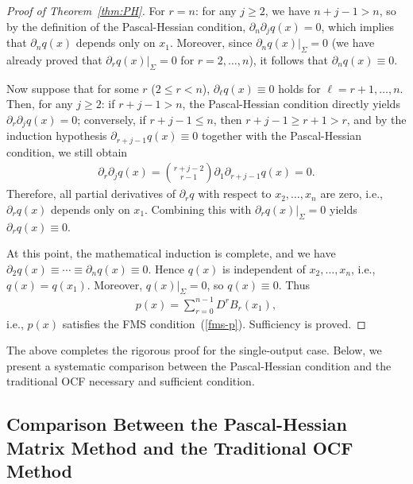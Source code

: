 \documentclass[11pt]{article}
\begin{document}
\begin{proof}[Proof of Theorem~\ref{thm:PH}]
	For $r=n$: for any $j\geq 2$, we have $n+j-1 > n$, so by the definition of the Pascal-Hessian condition, $\partial_n\partial_j q(x) = 0$, which implies that $\partial_n q(x)$ depends only on $x_1$. Moreover, since $\partial_n q(x)|_\Sigma = 0$ (we have already proved that $\partial_r q(x)|_\Sigma=0$ for $r=2,\ldots,n$), it follows that $\partial_n q(x) \equiv 0$.
	
	Now suppose that for some $r$ ($2 \leq r < n$), $\partial_\ell q(x) \equiv 0$ holds for $\ell = r+1,\ldots,n$. Then, for any $j\geq 2$: if $r+j-1 > n$, the Pascal-Hessian condition directly yields $\partial_r\partial_j q(x) = 0$; conversely, if $r+j-1 \leq n$, then $r+j-1 \geq r+1 > r$, and by the induction hypothesis $\partial_{r+j-1} q(x) \equiv 0$ together with the Pascal-Hessian condition, we still obtain
	\begin{align}
		\partial_r\partial_j q(x)=\binom{r+j-2}{r-1}\partial_1\partial_{r+j-1} q(x) = 0.
	\end{align}
	Therefore, all partial derivatives of $\partial_r q$ with respect to $x_2,\ldots,x_n$ are zero, i.e., $\partial_r q(x)$ depends only on $x_1$. Combining this with $\partial_r q(x)|_\Sigma = 0$ yields $\partial_r q(x) \equiv 0$.
	
	At this point, the mathematical induction is complete, and we have $\partial_2 q(x) \equiv \cdots \equiv \partial_n q(x) \equiv 0$. Hence $q(x)$ is independent of $x_2,\ldots,x_n$, i.e., $q(x) = q(x_1)$. Moreover, $q(x)|_\Sigma = 0$, so $q(x) \equiv 0$. Thus
	\begin{align}
		p(x) = \sum_{r=0}^{n-1} D^r B_r(x_1),
	\end{align}
	i.e., $p(x)$ satisfies the FMS condition~(\ref{fms-p}). Sufficiency is proved.
\end{proof}

The above completes the rigorous proof for the single-output case. Below, we present a systematic comparison between the Pascal-Hessian condition and the traditional OCF necessary and sufficient condition.

\subsection{Comparison Between the Pascal-Hessian Matrix Method and the Traditional OCF Method}\label{sec3.3}
\end{document}
